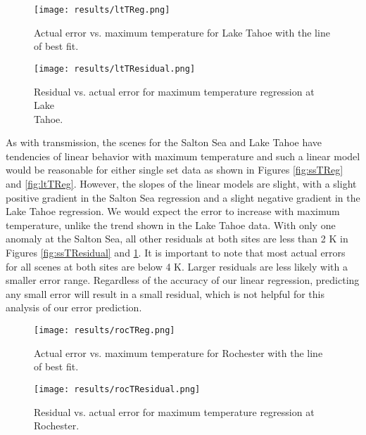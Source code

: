 \documentclass{book}
\begin{document}
\begin{figure}[H]
\begin{minipage}[b]{0.47\textwidth}
\centering
\texttt{[image: results/ltTReg.png]}
\caption{Actual error vs. maximum temperature for Lake Tahoe with the line of best fit.}
\label{fig:ltTReg}
\end{minipage}
\begin{minipage}[b]{0.47\textwidth}
\centering
\texttt{[image: results/ltTResidual.png]}
\caption{Residual vs. actual error for maximum temperature regression at Lake \\ Tahoe.}
\label{fig:ltTResidual}
\end{minipage}
\end{figure}

As with transmission, the scenes for the Salton Sea and Lake Tahoe have tendencies of linear behavior with maximum temperature and such a linear model would be reasonable for either single set data as shown in Figures \ref{fig:ssTReg} and \ref{fig:ltTReg}.  However, the slopes of the linear models are slight, with a slight positive gradient in the Salton Sea regression and a slight negative gradient in the Lake Tahoe regression.  We would expect the error to increase with maximum temperature, unlike the trend shown in the Lake Tahoe data.  With only one anomaly at the Salton Sea, all other residuals at both sites are less than 2 K in Figures \ref{fig:ssTResidual} and \ref{fig:ltTResidual}.  It is important to note that most actual errors for all scenes at both sites are below 4 K.  Larger residuals are less likely with a smaller error range.  Regardless of the accuracy of our linear regression, predicting any small error will result in a small residual, which is not helpful for this analysis of our error prediction.

\begin{figure}[H]
\begin{minipage}[b]{0.47\textwidth}
\centering
\texttt{[image: results/rocTReg.png]}
\caption{Actual error vs. maximum temperature for Rochester with the line of best fit.}
\label{fig:rocTReg}
\end{minipage}
\begin{minipage}[b]{0.47\textwidth}
\centering
\texttt{[image: results/rocTResidual.png]}
\caption{Residual vs. actual error for maximum temperature regression at \\ Rochester.}
\label{fig:rocTResidual}
\end{minipage}
\end{figure}
\end{document}
